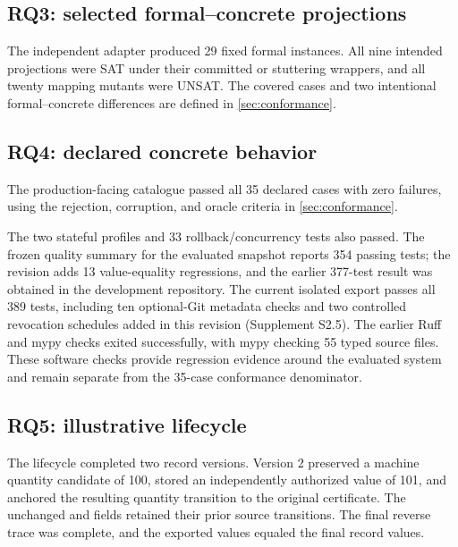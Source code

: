 \subsection{RQ3: selected formal--concrete projections}

The independent adapter produced 29 fixed formal instances. All nine intended projections were SAT under their committed or stuttering wrappers, and all twenty mapping mutants were UNSAT. The covered cases and two intentional formal--concrete differences are defined in \cref{sec:conformance}.

\subsection{RQ4: declared concrete behavior}

The production-facing catalogue passed all 35 declared cases with zero failures, using the rejection, corruption, and oracle criteria in \cref{sec:conformance}.

The two stateful profiles and 33 rollback/concurrency tests also passed. The frozen quality summary for the evaluated snapshot reports 354 passing tests; the revision adds 13 value-equality regressions, and the earlier 377-test result was obtained in the development repository. The current isolated export passes all 389 tests, including ten optional-Git metadata checks and two controlled revocation schedules added in this revision (Supplement S2.5). The earlier Ruff and mypy checks exited successfully, with mypy checking 55 typed source files. These software checks provide regression evidence around the evaluated system and remain separate from the 35-case conformance denominator.



\subsection{RQ5: illustrative lifecycle}

The lifecycle completed two record versions. Version 2 preserved a machine quantity candidate of 100, stored an independently authorized value of 101, and anchored the resulting quantity transition to the original certificate. The unchanged  and  fields retained their prior source transitions. The final reverse trace was complete, and the exported values equaled the final record values.

